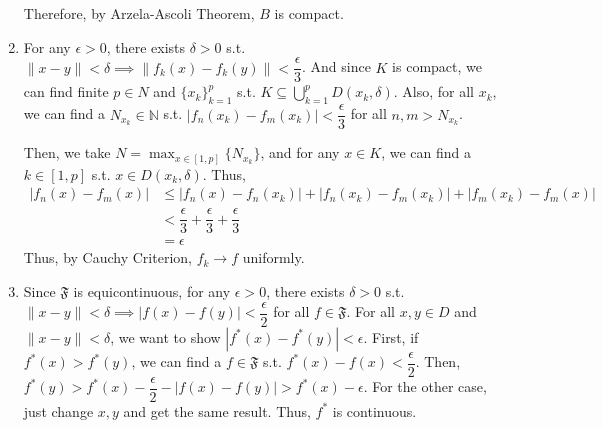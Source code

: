 \documentclass[12pt]{article}
\begin{document}
\begin{enumerate}
    Therefore, by Arzela-Ascoli Theorem, $B$ is compact.
    
    \newpage
    \item For any $\epsilon > 0$, there exists $\delta > 0$ s.t. $\| x-y\| < \delta \implies \| f_k(x) - f_k(y)\| < \dfrac{\epsilon}{3}$.
    And since $K$ is compact, we can find finite $p\in N$ and $\{ x_k\}_{k=1}^p$ s.t. $K \subseteq \displaystyle\bigcup_{k=1}^p D(x_k, \delta)$.
    Also, for all $x_k$, we can find a $N_{x_k}\in \mathbb{N}$ s.t. $|f_n(x_k) - f_m(x_k)| < \dfrac{\epsilon}{3}$ for all $n, m > N_{x_k}$.

    Then, we take $N = \displaystyle\max_{x\in [1, p]}\{ N_{x_k}\}$, and for any $x\in K$, we can find a $k\in [1, p]$ s.t. $x \in D(x_k, \delta)$.
    Thus, \begin{align*}
        |f_n(x) - f_m(x)| &\leq |f_n(x) - f_n(x_k)| + |f_n(x_k) - f_m(x_k)| + |f_m(x_k) - f_m(x)|\\
        &< \dfrac{\epsilon}{3} + \dfrac{\epsilon}{3} + \dfrac{\epsilon}{3}\\
        &= \epsilon
    \end{align*}
    Thus, by Cauchy Criterion, $f_k \to f$ uniformly.

    \item Since $\mathfrak{F}$ is equicontinuous, for any $\epsilon > 0$, there exists $\delta > 0$ s.t. $\| x-y\| < \delta \implies |f(x) - f(y)| < \dfrac{\epsilon}{2}$ for all $f\in \mathfrak{F}$.
    For all $x, y\in D$ and $\|x - y\| < \delta$, we want to show $|f^*(x) - f^*(y)| < \epsilon$.
    First, if $f^*(x) > f^*(y)$, we can find a $f\in \mathfrak{F}$ s.t. $f^*(x) - f(x) < \dfrac{\epsilon}{2}$.
    Then, $f^*(y) > f^*(x) - \dfrac{\epsilon}{2} - |f(x) - f(y)| > f^*(x) - \epsilon$.
    For the other case, just change $x, y$ and get the same result.
    Thus, $f^*$ is continuous.
\end{enumerate}
\end{document}
